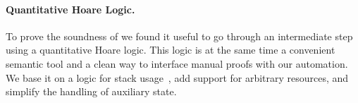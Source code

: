 \documentclass[nocopyrightspace,preprint,pldi]{sigplanconf-pldi15}
\newcommand{\ifshort}[2]{\ifx\fullversion\undefined{#1}\else{#2}\fi}
\newcommand{\paraskip}[0]{\ifshort{\vspace{-4pt}}{}}
\begin{document}

\paraskip
\paragraph{Quantitative Hoare Logic.}
To prove the soundness of \toolname we found it useful to go through
an intermediate step using a quantitative Hoare logic.  This logic is
at the same time a convenient semantic tool and a clean way to
interface manual proofs with our automation.  We base it on a logic
for stack usage~\cite{veristack14}, add support for arbitrary
resources, and simplify the handling of auxiliary state.
\end{document}

